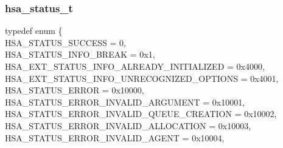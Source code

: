 \documentclass[final]{book}
\newcommand{\reftyp}[1]{#1}
\newcommand{\refenu}[1]{\reftyp{#1}}
\newenvironment{mylongtable}{\rowcolors{0}{lightgray}{lightgray}\longtable} {
\endlongtable}
\begin{document}
\subsubsection{hsa_\-status_\-t}
\vspace{-5.5mm}\begin{mylongtable}{@{}p{\textwidth}}
\rule{0pt}{3ex}typedef enum \{\\\hspace{1.7em}\hypertarget{group__status_1ggad755322e7ff95456520e8abdbe90d225ae382ea0c9c05cce5a60d0317375159cc}{\refenu{HSA_\-STATUS_\-SUCCESS}} = 0,\\
\hspace{1.7em}\hypertarget{group__status_1ggad755322e7ff95456520e8abdbe90d225a86c476121ca787ff75f6a4676507b221}{\refenu{HSA_\-STATUS_\-INFO_\-BREAK}} = 0x1,\\
\hspace{1.7em}\hypertarget{group__status_1ggad755322e7ff95456520e8abdbe90d225a0882e3ebb9cc8a5c6033c43ee7a6d898}{\refenu{HSA_\-EXT_\-STATUS_\-INFO_\-ALREADY_\-INITIALIZED}} = 0x4000,\\
\hspace{1.7em}\hypertarget{group__status_1ggad755322e7ff95456520e8abdbe90d225a60343279bea68766b037297915b5f903}{\refenu{HSA_\-EXT_\-STATUS_\-INFO_\-UNRECOGNIZED_\-OPTIONS}} = 0x4001,\\
\hspace{1.7em}\hypertarget{group__status_1ggad755322e7ff95456520e8abdbe90d225a60edf4d82e4703ff750ea38d619fea88}{\refenu{HSA_\-STATUS_\-ERROR}} = 0x10000,\\
\hspace{1.7em}\hypertarget{group__status_1ggad755322e7ff95456520e8abdbe90d225ac7d3651f75107d2a6a8ba3b25683c030}{\refenu{HSA_\-STATUS_\-ERROR_\-INVALID_\-ARGUMENT}} = 0x10001,\\
\hspace{1.7em}\hypertarget{group__status_1ggad755322e7ff95456520e8abdbe90d225a7b27f50e23a776b496b8b4707f21ccad}{\refenu{HSA_\-STATUS_\-ERROR_\-INVALID_\-QUEUE_\-CREATION}} = 0x10002,\\
\hspace{1.7em}\hypertarget{group__status_1ggad755322e7ff95456520e8abdbe90d225ac818189ff640d38ce13558e72daddb75}{\refenu{HSA_\-STATUS_\-ERROR_\-INVALID_\-ALLOCATION}} = 0x10003,\\
\hspace{1.7em}\hypertarget{group__status_1ggad755322e7ff95456520e8abdbe90d225a3a5d835c109c2d0ad5b9c2771e133e5d}{\refenu{HSA_\-STATUS_\-ERROR_\-INVALID_\-AGENT}} = 0x10004,\\

\end{mylongtable}
\end{document}
